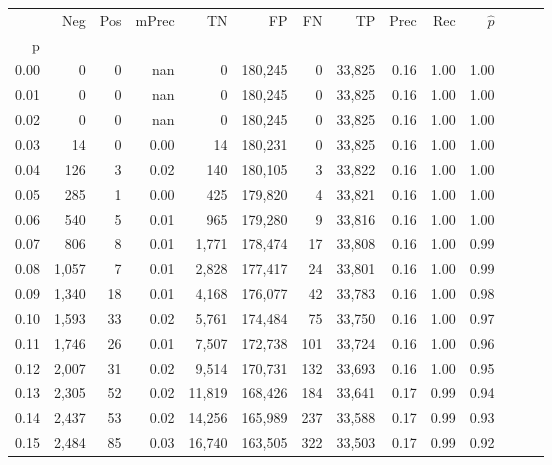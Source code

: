 \begin{tabular}{rrrrrrrrrrrrrr}
\toprule
{} &    Neg &  Pos & mPrec &       TN &       FP &      FN &      TP &  Prec &   Rec & $\hat{p}$ \\
p    &        &      &       &          &          &         &         &       &       &           \\
\midrule
0.00 &      0 &    0 &   nan &        0 &  180,245 &       0 &  33,825 &  0.16 &  1.00 &      1.00 \\
0.01 &      0 &    0 &   nan &        0 &  180,245 &       0 &  33,825 &  0.16 &  1.00 &      1.00 \\
0.02 &      0 &    0 &   nan &        0 &  180,245 &       0 &  33,825 &  0.16 &  1.00 &      1.00 \\
0.03 &     14 &    0 &  0.00 &       14 &  180,231 &       0 &  33,825 &  0.16 &  1.00 &      1.00 \\
0.04 &    126 &    3 &  0.02 &      140 &  180,105 &       3 &  33,822 &  0.16 &  1.00 &      1.00 \\
0.05 &    285 &    1 &  0.00 &      425 &  179,820 &       4 &  33,821 &  0.16 &  1.00 &      1.00 \\
0.06 &    540 &    5 &  0.01 &      965 &  179,280 &       9 &  33,816 &  0.16 &  1.00 &      1.00 \\
0.07 &    806 &    8 &  0.01 &    1,771 &  178,474 &      17 &  33,808 &  0.16 &  1.00 &      0.99 \\
0.08 &  1,057 &    7 &  0.01 &    2,828 &  177,417 &      24 &  33,801 &  0.16 &  1.00 &      0.99 \\
0.09 &  1,340 &   18 &  0.01 &    4,168 &  176,077 &      42 &  33,783 &  0.16 &  1.00 &      0.98 \\
0.10 &  1,593 &   33 &  0.02 &    5,761 &  174,484 &      75 &  33,750 &  0.16 &  1.00 &      0.97 \\
0.11 &  1,746 &   26 &  0.01 &    7,507 &  172,738 &     101 &  33,724 &  0.16 &  1.00 &      0.96 \\
0.12 &  2,007 &   31 &  0.02 &    9,514 &  170,731 &     132 &  33,693 &  0.16 &  1.00 &      0.95 \\
0.13 &  2,305 &   52 &  0.02 &   11,819 &  168,426 &     184 &  33,641 &  0.17 &  0.99 &      0.94 \\
0.14 &  2,437 &   53 &  0.02 &   14,256 &  165,989 &     237 &  33,588 &  0.17 &  0.99 &      0.93 \\
0.15 &  2,484 &   85 &  0.03 &   16,740 &  163,505 &     322 &  33,503 &  0.17 &  0.99 &      0.92 \\

\end{tabular}
